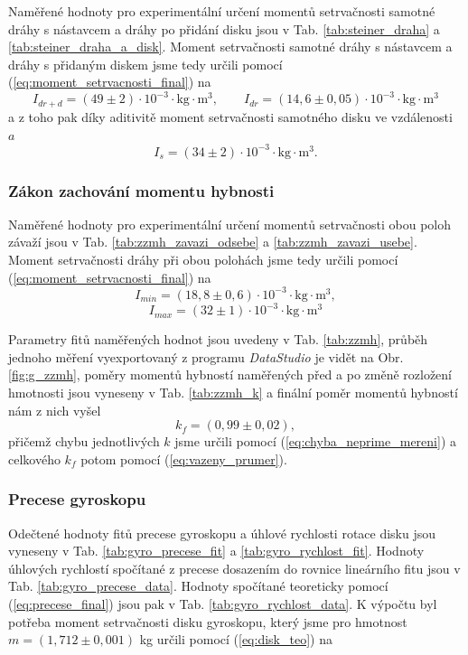 \documentclass[english]{article}
\newcommand{\unit}[1]{\mathrm{#1}}
\begin{document}
		Naměřené hodnoty pro experimentální určení momentů setrvačnosti samotné dráhy s nástavcem a dráhy po přidání disku jsou v Tab. \ref{tab:steiner_draha} a \ref{tab:steiner_draha_a_disk}. Moment setrvačnosti samotné dráhy s nástavcem a dráhy s přidaným diskem jsme tedy určili pomocí (\ref{eq:moment_setrvacnosti_final}) na
		\begin{equation}
			I_{dr+d} = (49\pm2) \cdot \unit{10^{-3} \cdot kg \cdot m^3}, \qquad 
			I_{dr} = (14,6\pm0,05) \cdot \unit{10^{-3} \cdot kg \cdot m^3}
		\end{equation}
		a z toho pak díky aditivitě moment setrvačnosti samotného disku ve vzdálenosti $a$		
		\begin{equation}
			I_{s} = (34\pm2) \cdot \unit{10^{-3} \cdot kg \cdot m^3}.
		\end{equation}		
		
	\subsubsection{Zákon zachování momentu hybnosti}
		Naměřené hodnoty pro experimentální určení momentů setrvačnosti obou poloh závaží jsou v Tab. \ref{tab:zzmh_zavazi_odsebe} a \ref{tab:zzmh_zavazi_usebe}. Moment setrvačnosti dráhy při obou polohách jsme tedy určili pomocí (\ref{eq:moment_setrvacnosti_final}) na
		\begin{equation}
			I_{min} = (18,8\pm0,6) \cdot \unit{10^{-3} \cdot kg \cdot m^3}, 
		\end{equation}	
		\begin{equation}
			I_{max} = (32\pm1) \cdot \unit{10^{-3} \cdot kg \cdot m^3} 
		\end{equation}	
		
		Parametry fitů naměřených hodnot jsou uvedeny v Tab. \ref{tab:zzmh}, průběh jednoho měření vyexportovaný z programu \emph{DataStudio} je vidět na Obr. \ref{fig:g_zzmh}, poměry momentů hybností naměřených před a po změně rozložení hmotnosti jsou vyneseny v Tab. \ref{tab:zzmh_k} a finální poměr momentů hybností nám z nich vyšel
		\begin{equation}
			k_f = (0,99\pm0,02), 
		\end{equation}			
		přičemž chybu jednotlivých $k$ jsme určili pomocí (\ref{eq:chyba_neprime_mereni}) a celkového $k_f$ potom pomocí (\ref{eq:vazeny_prumer}).
		
	\subsubsection{Precese gyroskopu}
		Odečtené hodnoty fitů precese gyroskopu a úhlové rychlosti rotace disku jsou vyneseny v Tab. \ref{tab:gyro_precese_fit} a \ref{tab:gyro_rychlost_fit}. Hodnoty úhlových rychlostí spočítané z precese dosazením do rovnice lineárního fitu jsou v Tab. \ref{tab:gyro_precese_data}. Hodnoty spočítané teoreticky pomocí (\ref{eq:precese_final}) jsou pak v Tab. \ref{tab:gyro_rychlost_data}. K výpočtu byl potřeba moment setrvačnosti disku gyroskopu, který jsme pro hmotnost $m = (1,712\pm0,001)$ kg určili pomocí (\ref{eq:disk_teo}) na 
		
\end{document}
